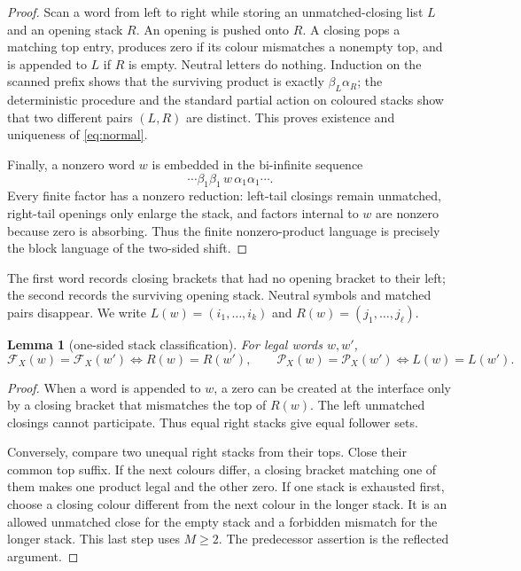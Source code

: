 \documentclass[11pt,a4paper]{amsart}
\newtheorem{lemma}[theorem]{Lemma}
\theoremstyle{definition}
\theoremstyle{remark}
\newcommand{\cF}{\mathcal F}
\newcommand{\cP}{\mathcal P}
\begin{document}
\begin{proof}
Scan a word from left to right while storing an unmatched-closing list $L$
and an opening stack $R$.  An opening is pushed onto $R$.  A closing pops a
matching top entry, produces zero if its colour mismatches a nonempty top, and
is appended to $L$ if $R$ is empty.  Neutral letters do nothing.  Induction on
the scanned prefix shows that the surviving product is exactly
$\beta_L\alpha_R$; the deterministic procedure and the standard partial
action on coloured stacks show that two different pairs $(L,R)$ are distinct.
This proves existence and uniqueness of \eqref{eq:normal}.

Finally, a nonzero word $w$ is embedded in the bi-infinite sequence
\[
 \cdots\beta_1\beta_1\,w\,\alpha_1\alpha_1\cdots .
\]
Every finite factor has a nonzero reduction: left-tail closings remain
unmatched, right-tail openings only enlarge the stack, and factors internal to
$w$ are nonzero because zero is absorbing.  Thus the finite nonzero-product
language is precisely the block language of the two-sided shift.
\end{proof}

The first word records closing brackets that had no opening bracket to their
left; the second records the surviving opening stack.  Neutral symbols and
matched pairs disappear.  We write $L(w)=(i_1,\ldots,i_k)$ and
$R(w)=(j_1,\ldots,j_\ell)$.

\begin{lemma}[one-sided stack classification]\label{lem:one-sided}
For legal words $w,w'$,
\[
 \cF_X(w)=\cF_X(w')\iff R(w)=R(w'),
 \qquad
 \cP_X(w)=\cP_X(w')\iff L(w)=L(w').
\]
\end{lemma}

\begin{proof}
When a word is appended to $w$, a zero can be created at the interface only
by a closing bracket that mismatches the top of $R(w)$.  The left unmatched
closings cannot participate.  Thus equal right stacks give equal follower
sets.

Conversely, compare two unequal right stacks from their tops.  Close their
common top suffix.  If the next colours differ, a closing bracket matching
one of them makes one product legal and the other zero.  If one stack is
exhausted first, choose a closing colour different from the next colour in
the longer stack.  It is an allowed unmatched close for the empty stack and
a forbidden mismatch for the longer stack.  This last step uses $M\geq2$.
The predecessor assertion is the reflected argument.
\end{proof}
\end{document}
